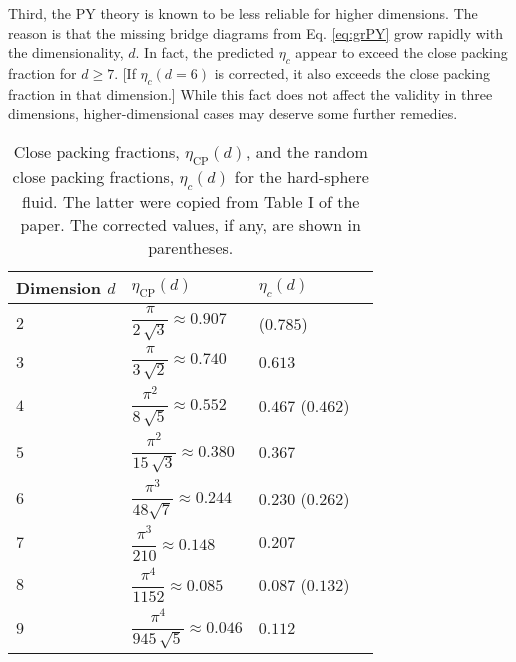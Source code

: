 \documentclass{article}
\begin{document}
Third, the PY theory is known to be less reliable for higher dimensions.
The reason is that the missing bridge diagrams from Eq. \eqref{eq:grPY}
grow rapidly with the dimensionality, $d$.
In fact, the predicted $\eta_c$ appear to exceed the close packing fraction
for $d \ge 7$.
[If $\eta_c(d = 6)$ is corrected, it also exceeds the close packing fraction
in that dimension.]
While this fact does not affect the validity in three dimensions,
higher-dimensional cases may deserve some further remedies.

\begin{table*}[h]
\centering
\renewcommand{\arraystretch}{2.5}
\begin{tabular}{llll}
Dimension $d$     &   $\eta_\mathrm{CP}(d)$  & $\eta_c(d)$ \\
\hline
$2$     &   $\dfrac{ \pi } { 2 \, \sqrt 3 } \approx 0.907$      & ($0.785$) \\
$3$     &   $\dfrac{ \pi } { 3 \, \sqrt 2 } \approx 0.740$      & $0.613$ \\
$4$     &   $\dfrac{ \pi^2 } { 8 \, \sqrt{5} } \approx 0.552$   & $0.467$ ($0.462$) \\
$5$     &   $\dfrac{ \pi^2 } { 15 \, \sqrt 3 } \approx 0.380$   & $0.367$ \\
$6$     &   $\dfrac{ \pi^3 } { 48 \sqrt{7} } \approx 0.244$     & $0.230$ ($0.262$) \\
$7$     &   $\dfrac{ \pi^3 } { 210 } \approx 0.148$             & $0.207$ \\
$8$     &   $\dfrac{ \pi^4 } { 1152 } \approx 0.085$            & $0.087$ ($0.132$) \\
$9$     &   $\dfrac{ \pi^4 } { 945 \, \sqrt 5 } \approx 0.046$  & $0.112$
\end{tabular}
\caption{Close packing fractions, $\eta_\mathrm{CP}(d)$,
and the random close packing fractions, $\eta_c(d)$
for the hard-sphere fluid.
The latter were copied from Table I of the paper.
The corrected values, if any, are shown in parentheses. }
\end{table*}



\end{document}
